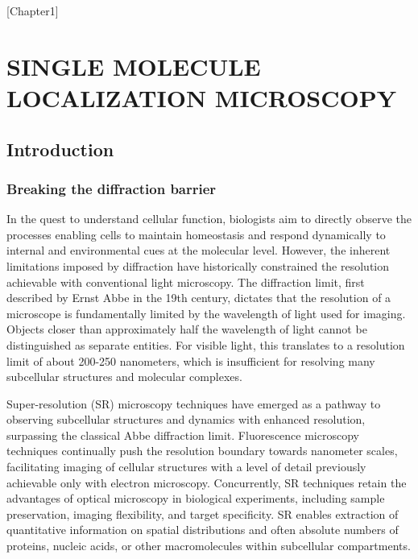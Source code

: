[Chapter1]

\chapter{SINGLE MOLECULE LOCALIZATION MICROSCOPY}

\section{Introduction}

\subsection{Breaking the diffraction barrier}

In the quest to understand cellular function, biologists aim to directly observe the processes enabling cells to maintain homeostasis and respond dynamically to internal and environmental cues at the molecular level. However, the inherent limitations imposed by diffraction have historically constrained the resolution achievable with conventional light microscopy. The diffraction limit, first described by Ernst Abbe in the 19th century, dictates that the resolution of a microscope is fundamentally limited by the wavelength of light used for imaging. Objects closer than approximately half the wavelength of light cannot be distinguished as separate entities. For visible light, this translates to a resolution limit of about 200-250 nanometers, which is insufficient for resolving many subcellular structures and molecular complexes.

Super-resolution (SR) microscopy techniques have emerged as a pathway to observing subcellular structures and dynamics with enhanced resolution, surpassing the classical Abbe diffraction limit. Fluorescence microscopy techniques continually push the resolution boundary towards nanometer scales, facilitating imaging of cellular structures with a level of detail previously achievable only with electron microscopy. Concurrently, SR techniques retain the advantages of optical microscopy in biological experiments, including sample preservation, imaging flexibility, and target specificity. SR enables extraction of quantitative information on spatial distributions and often absolute numbers of proteins, nucleic acids, or other macromolecules within subcellular compartments.

